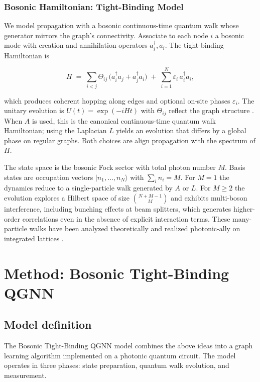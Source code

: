 \documentclass[11pt]{article}
\begin{document}
\subsubsection{Bosonic Hamiltonian: Tight-Binding Model}

We model propagation with a bosonic continuous-time quantum walk whose generator mirrors the graph's connectivity. Associate to each node $i$ a bosonic mode with creation and annihilation operators $a_i^\dagger,a_i$. The tight-binding Hamiltonian is

$$
H \;=\; \sum_{i<j} \Theta_{ij}\,\big(a_i^\dagger a_j + a_j^\dagger a_i\big)\;+\;\sum_{i=1}^N \varepsilon_i\,a_i^\dagger a_i,
$$

which produces coherent hopping along edges and optional on-site phases $\varepsilon_i$. The unitary evolution is $U(t)=\exp(-iHt)$ with $\Theta_{ij}$ reflect the graph structure . When $A$ is used, this is the canonical continuous-time quantum walk Hamiltonian; using the Laplacian $L$ yields an evolution that differs by a global phase on regular graphs. Both choices are align propagation with the spectrum of $H$.

The state space is the bosonic Fock sector with total photon number $M$. Basis states are occupation vectors $\lvert n_1,\dots,n_N\rangle$ with $\sum_i n_i=M$. For $M=1$ the dynamics reduce to a single-particle walk generated by $A$ or $L$. For $M\ge2$ the evolution explores a Hilbert space of size $\binom{N+M-1}{M}$ and exhibits multi-boson interference, including bunching effects at beam splitters, which generates higher-order correlations even in the absence of explicit interaction terms. These many-particle walks have been analyzed theoretically and realized photonic-ally on integrated lattices \citep{campos1989beamsplitter,reck1994universal,clements2016optical,hong1987hom,aaronson2011bosonsampling}.

\section{Method: Bosonic Tight-Binding QGNN}

\subsection{Model definition}

The Bosonic Tight-Binding QGNN model combines the above ideas into a graph learning algorithm implemented on a photonic quantum circuit. The model operates in three phases: state preparation, quantum walk evolution, and measurement.
\end{document}
